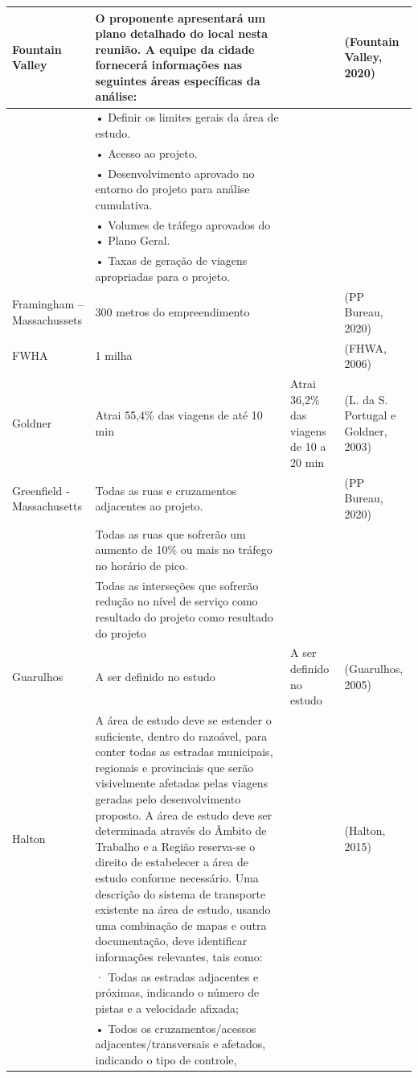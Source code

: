 \documentclass[]{article}
\begin{document}
\begin{table}
\begin{tabular}[t]{l|l|l|l}
\hline
Fountain Valley & O proponente apresentará um plano detalhado do local nesta reunião. A equipe da cidade fornecerá informações nas seguintes áreas específicas da análise: &  & (Fountain Valley, 2020)\\
\hline
 & • Definir os limites gerais da área de estudo. &  & \\
\hline
 & • Acesso ao projeto. &  & \\
\hline
 & • Desenvolvimento aprovado no entorno do projeto para análise cumulativa. &  & \\
\hline
 & • Volumes de tráfego aprovados do • Plano Geral. &  & \\
\hline
 & • Taxas de geração de viagens apropriadas para o projeto. &  & \\
\hline
Framingham – Massachussets & 300 metros do empreendimento &  & (PP Bureau, 2020)\\
\hline
FWHA & 1 milha &  & (FHWA, 2006)\\
\hline
Goldner & Atrai 55,4\% das viagens de até 10 min & Atrai 36,2\% das viagens de 10 a 20 min & (L. da S. Portugal e Goldner, 2003)\\
\hline
Greenfield - Massachusetts & Todas as ruas e cruzamentos adjacentes ao projeto. &  & (PP Bureau, 2020)\\
\hline
 & Todas as ruas que sofrerão um aumento de 10\% ou mais no tráfego no horário de pico. &  & \\
\hline
 & Todas as interseções que sofrerão redução no nível de serviço como resultado do projeto como resultado do projeto &  & \\
\hline
Guarulhos & A ser definido no estudo & A ser definido no estudo & (Guarulhos, 2005)\\
\hline
Halton & A área de estudo deve se estender o suficiente, dentro do razoável, para conter todas as estradas municipais, regionais e provinciais que serão visivelmente afetadas pelas viagens geradas pelo desenvolvimento proposto. A área de estudo deve ser determinada através do Âmbito de Trabalho e a Região reserva-se o direito de estabelecer a área de estudo conforme necessário. Uma descrição do sistema de transporte existente na área de estudo, usando uma combinação de mapas e outra documentação, deve identificar informações relevantes, tais como: &  & (Halton, 2015)\\
\hline
 & · Todas as estradas adjacentes e próximas, indicando o número de pistas e a velocidade afixada; &  & \\
\hline
 & • Todos os cruzamentos/acessos adjacentes/transversais e afetados, indicando o tipo de controle, &  & \\

\end{tabular}
\end{table}
\end{document}

